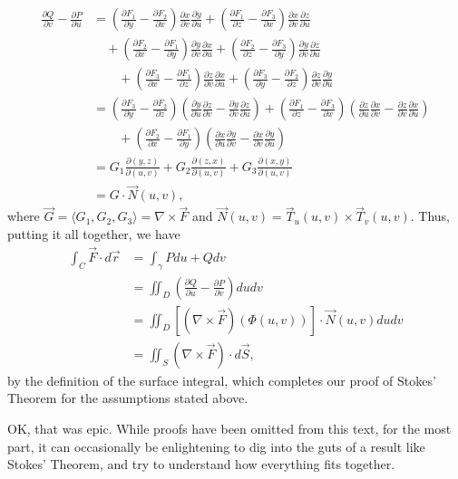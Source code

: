 \begin{align*}
 \frac{\partial Q}{\partial v}-\frac{\partial P}{\partial u} & = \left(\frac{\partial F_1}{\partial y}-\frac{\partial F_2}{\partial x}\right)\frac{\partial x}{\partial v}\frac{\partial y}{\partial u}+\left(\frac{\partial F_1}{\partial z}-\frac{\partial F_3}{\partial x}\right)\frac{\partial x}{\partial v}\frac{\partial z}{\partial u}\\
&\quad + \left(\frac{\partial F_2}{\partial x}-\frac{\partial F_1}{\partial y}\right)\frac{\partial y}{\partial v}\frac{\partial x}{\partial u}+\left(\frac{\partial F_2}{\partial z}-\frac{\partial F_3}{\partial y}\right)\frac{\partial y}{\partial v}\frac{\partial z}{\partial u}\\
&  \quad \quad + \left(\frac{\partial F_3}{\partial x}-\frac{\partial F_1}{\partial z}\right)\frac{\partial z}{\partial v}\frac{\partial x}{\partial u}+\left(\frac{\partial F_3}{\partial y}-\frac{\partial F_2}{\partial z}\right)\frac{\partial z}{\partial v}\frac{\partial y}{\partial u}\\
& = \left(\frac{\partial F_3}{\partial y}-\frac{\partial F_2}{\partial z}\right)\left(\frac{\partial y}{\partial u}\frac{\partial z}{\partial v}-\frac{\partial y}{\partial v}\frac{\partial z}{\partial u}\right)+\left(\frac{\partial F_1}{\partial z}-\frac{\partial F_3}{\partial x}\right)\left(\frac{\partial z}{\partial u}\frac{\partial x}{\partial v}-\frac{\partial z}{\partial v}\frac{\partial x}{\partial u}\right)\\
&\quad \quad +\left(\frac{\partial F_2}{\partial x}-\frac{\partial F_1}{\partial y}\right)\left(\frac{\partial x}{\partial u}\frac{\partial y}{\partial v}-\frac{\partial x}{\partial v}\frac{\partial y}{\partial u}\right)\\
& = G_1\frac{\partial(y,z)}{\partial(u,v)}+G_2\frac{\partial(z,x)}{\partial (u,v)}+G_3\frac{\partial (x,y)}{\partial (u,v)}\\
& = G\cdot \vec{N}(u,v),
\end{align*}
where $\vec{G} = \langle G_1,G_2,G_3\rangle = \nabla\times \vec{F}$ and $\vec{N}(u,v) = \vec{T}_u(u,v)\times\vec{T}_v(u,v)$. Thus, putting it all together, we have
\begin{align*}
 \int_C \vec{F}\cdot d\vec{r} & = \int_\gamma Pdu+Qdv \\
& = \iint_D \left(\frac{\partial Q}{\partial u}-\frac{\partial P}{\partial v}\right)dudv\\
& = \iint_D \left[(\nabla\times \vec{F})(\Phi(u,v))\right]\cdot \vec{N}(u,v) dudv\\
& = \iint_S \left(\nabla\times \vec{F}\right)\cdot d\vec{S},
\end{align*}
by the definition of the surface integral, which completes our proof of Stokes' Theorem for the assumptions stated above.

\bigskip

OK, that was epic. While proofs have been omitted from this text, for the most part, it can occasionally be enlightening to dig into the guts of a result like Stokes' Theorem, and try to understand how everything fits together.
